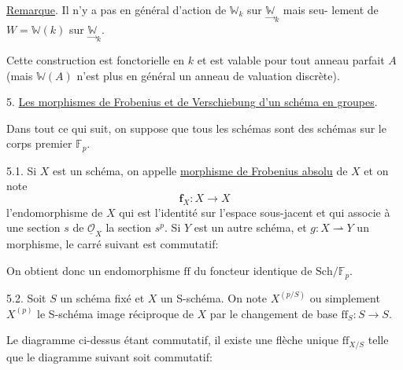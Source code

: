 \documentclass[11pt]{article}
\newcommand{\scanpage}[1]{\par\bigskip\noindent{\small\sffamily[scan #1]}\par}
\newcommand{\mspage}[1]{{\small\sffamily[p.\,#1]}}
\newcommand{\hand}[1]{\textcolor{blue}{#1}}
\newcommand{\uline}[1]{\underline{#1}}
\newenvironment{diagramblock}{\par\begin{center}}{\end{center}\par}
\begin{document}
\uline{Remarque}. Il n'y a pas en général d'action de $\mathbb{W}_k$ sur $\underset{\to}{\mathbb{W}}_k$ mais seu-%
lement de $W = \mathbb{W}(k)$ sur $\underset{\to}{\mathbb{W}}_k$.

Cette construction est fonctorielle en $k$ et est valable pour
tout anneau parfait $A$ (mais $\mathbb{W}(A)$ n'est plus en général un anneau de
valuation discrète).

5. \uline{Les morphismes de Frobenius et de Verschiebung d'un schéma en groupes}.

Dans tout ce qui suit, on suppose que tous les schémas sont des
schémas sur le corps premier $\mathbb{F}_p$.

5.1. Si $X$ est un schéma, on appelle \uline{morphisme de Frobenius absolu}
de $X$ et on note
\[ \mathbf{f}_X : X \to X \]
l'endomorphisme de $X$ qui est l'identité sur l'espace sous-jacent et
qui associe à une section $s$ de $\underline{\mathcal{O}}_X$ la section $s^p$. Si $Y$ est un
autre schéma, et $g: X \rightharpoonup Y$ un morphisme, le carré suivant est commutatif:

\mspage{\hand{10}}

\clearpage
\scanpage{129/11}
\begin{diagramblock}\end{diagramblock}

On obtient donc un endomorphisme $\mathrm{ff}$ du foncteur identique de $\mathrm{Sch}/\mathbb{F}_p$.

5.2. Soit $S$ un schéma fixé et $X$ un S-schéma. On note $X^{(p/S)}$
ou simplement $X^{(p)}$ le S-schéma image réciproque de $X$ par le changement
de base $\mathrm{ff}_S : S \to S$.

Le diagramme ci-dessus étant commutatif, il existe une flèche
unique $\mathrm{ff}_{X/S}$ telle que le diagramme suivant soit commutatif:

\begin{diagramblock}\end{diagramblock}
\end{document}
